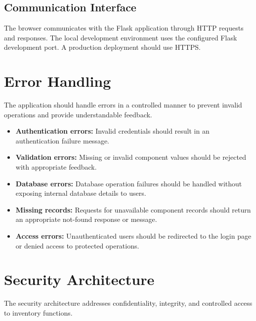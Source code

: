 \documentclass[conference]{IEEEtran}
\begin{document}
\subsection{Communication Interface}
The browser communicates with the Flask application through HTTP requests and responses. The local development environment uses the configured Flask development port. A production deployment should use HTTPS.

\section{Error Handling}

The application should handle errors in a controlled manner to prevent invalid operations and provide understandable feedback.

\begin{itemize}
\item \textbf{Authentication errors:} Invalid credentials should result in an authentication failure message.
\item \textbf{Validation errors:} Missing or invalid component values should be rejected with appropriate feedback.
\item \textbf{Database errors:} Database operation failures should be handled without exposing internal database details to users.
\item \textbf{Missing records:} Requests for unavailable component records should return an appropriate not-found response or message.
\item \textbf{Access errors:} Unauthenticated users should be redirected to the login page or denied access to protected operations.
\end{itemize}

\section{Security Architecture}

The security architecture addresses confidentiality, integrity, and controlled access to inventory functions.
\end{document}
